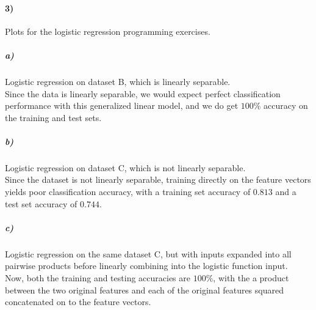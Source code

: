 \documentclass[10pt,letter]{article}
\begin{document}
\paragraph{3)} Plots for the logistic regression programming exercises.

\subparagraph{a)} Logistic regression on dataset B, which is linearly separable.\\

Since the data is linearly separable, we would expect perfect classification performance with 
this generalized linear model, and we do get $100\%$ accuracy on the training and test sets.

\subparagraph{b)} Logistic regression on dataset C, which is not linearly separable.\\

Since the dataset is not linearly separable, training directly on the feature vectors yields poor 
classification accuracy, with a training set accuracy of $0.813$ and a test set accuracy of $0.744$.

\subparagraph{c)} Logistic regression on the same dataset C, but with inputs expanded into all 
    pairwise products before linearly combining into the logistic function input.\\

Now, both the training and testing accuracies are $100\%$, with the a product between the two 
original features and each of the original features squared concatenated on to the feature vectors.
\end{document}
